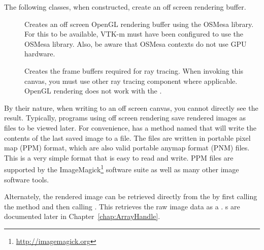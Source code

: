 The following classes, when constructed, create an off screen rendering
buffer.

\begin{description}
\item[] 
    Creates an off screen OpenGL
  rendering buffer using the OSMesa library. For this to be available,
  VTK-m must have been configured to use the OSMesa library. Also, be aware
  that OSMesa contexts do not use GPU hardware.
\item[] 
    Creates the frame
  buffers required for ray tracing. When invoking this canvas, you must use
  other ray tracing component where applicable. OpenGL rendering does not
  work with the .
\end{description}


By their nature, when writing to an off screen canvas, you cannot directly
see the result. Typically, programs using off screen rendering save
rendered images as files to be viewed later. For convenience,
 has a method named  that will
write the contents of the last saved image to a file. The files are written
in  portable pixel map (PPM) format,
which are also valid  portable
anymap format (PNM) files. This is a very simple format that is easy to
read and write. PPM files are supported by the
ImageMagick\footnote{\url{http://imagemagick.org}} software suite as well
as many other image software tools.


Alternately, the rendered image can be retrieved directly from the
 by first calling the 
method and then calling . This retrieves the raw
image data as a . s are
documented later in Chapter~\ref{chap:ArrayHandle}.




